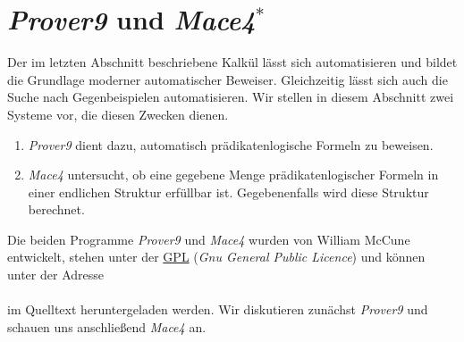 \section{\textsl{Prover9} und \textsl{Mace4}$^*$}
Der im letzten Abschnitt beschriebene Kalkül lässt sich automatisieren und bildet die Grundlage moderner
automatischer Beweiser.  Gleichzeitig lässt sich auch die Suche nach Gegenbeispielen automatisieren.
Wir stellen in diesem Abschnitt zwei Systeme vor, die diesen Zwecken dienen.
\begin{enumerate}
\item \textsl{Prover9} dient dazu, automatisch prädikatenlogische Formeln zu beweisen.
\item \textsl{Mace4} untersucht, ob eine gegebene Menge prädikatenlogischer Formeln in einer endlichen
  Struktur erfüllbar ist.  Gegebenenfalls wird diese Struktur berechnet.
\end{enumerate}
Die beiden Programme \textsl{Prover9} und \textsl{Mace4} wurden von William McCune \cite{mccune:2010} 
entwickelt, stehen unter der \href{http://www.gnu.org/licenses/gpl.html}{GPL} (\emph{Gnu General
  Public Licence}) und können unter der Adresse 
\\[0.2cm]
\hspace*{1.3cm}
\href{http://www.cs.unm.edu/~mccune/prover9/download/}{}
\\[0.2cm]
im Quelltext heruntergeladen werden.  Wir diskutieren zunächst \textsl{Prover9} und schauen uns anschließend
\textsl{Mace4} an.

